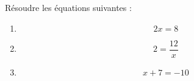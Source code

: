 
\begin{mental}
    Résoudre les équations suivantes :
    \begin{enumerate}
        \item
            \begin{equation}
                2x=8
            \end{equation}
        \item
            \begin{equation}
                2=\frac{ 12 }{ x }
            \end{equation}
        \item
            \begin{equation}
                x+7=-10
            \end{equation}
    \end{enumerate}
\end{mental}
